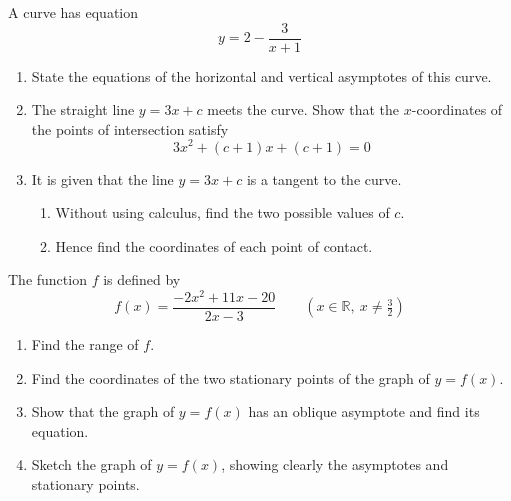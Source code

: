 \documentclass[leqno]{article}
\begin{document}
\begin{enumerate}[
  label=\textbf{\arabic*.},
  leftmargin=*,
  topsep=0pt,
  partopsep=0pt,
  parsep=0pt
]
\newpage

\questionitem

A curve has equation
\[
y = 2 - \frac{3}{x+1}
\]
\begin{enumerate}[label=\textbf{(\alph*)}]
  \item State the equations of the horizontal and vertical asymptotes of this curve.  \\
  \item The straight line $y=3x+c$ meets the curve. Show that the $x$-coordinates of the points of intersection satisfy
  \[
  3x^2+(c+1)x+(c+1)=0
  \]
  \item It is given that the line $y=3x+c$ is a tangent to the curve. \\
  \begin{enumerate}[label=(\roman*)]
    \item Without using calculus, find the two possible values of $c$.  
    \item Hence find the coordinates of each point of contact. 
  \end{enumerate}
\end{enumerate}

\newpage

\questionitem

The function $f$ is defined by
\[
f(x)=\frac{-2x^2+11x-20}{2x-3} \qquad (x \in \mathbb{R},\ x \ne \tfrac{3}{2})
\]
\begin{enumerate}[label=\textbf{(\alph*)}]
  \item Find the range of $f$.  \\
  \item Find the coordinates of the two stationary points of the graph of $y=f(x)$.  \\
  \item Show that the graph of $y=f(x)$ has an oblique asymptote and find its equation.  \\
  \item Sketch the graph of $y=f(x)$, showing clearly the asymptotes and stationary points.  \\
\end{enumerate}

\newpage

\questionitem



\end{enumerate}
\end{document}
